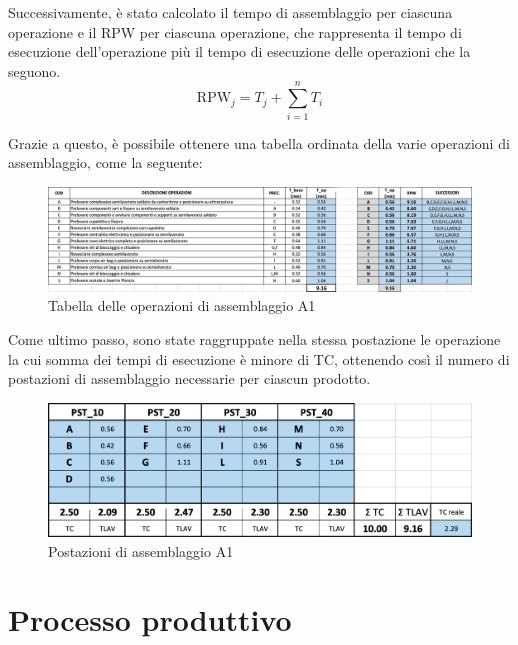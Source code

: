 \documentclass[11pt]{article}
\begin{document}
Successivamente, è stato calcolato il tempo di assemblaggio per ciascuna operazione e il RPW per ciascuna operazione, che rappresenta il tempo di esecuzione dell'operazione più il tempo di esecuzione delle operazioni che la seguono.
\begin{equation}
    \text{RPW}_j = T_j + \sum_{i=1}^{n} T_i
\end{equation}

Grazie a questo, è possibile ottenere una tabella ordinata della varie operazioni di assemblaggio, come la seguente:
\begin{figure} [H]
    \centering
    \includegraphics[width=\textwidth]{images/Tabella operazioni assemblaggio A1.png}
    \caption{Tabella delle operazioni di assemblaggio A1}
    \label{fig: Tabella delle operazioni di assemblaggio A1}
\end{figure}

Come ultimo passo, sono state raggruppate nella stessa postazione le operazione la cui somma dei tempi di esecuzione è minore di TC, ottenendo così il numero di postazioni di assemblaggio necessarie per ciascun prodotto.
\begin{figure} [H]
    \centering
    \includegraphics[width=\textwidth]{images/Postazioni assemblaggio A1.png}
    \caption{Postazioni di assemblaggio A1}
    \label{fig: Postazioni di assemblaggio A1}
\end{figure}

\newpage


\section{Processo produttivo}
\end{document}
